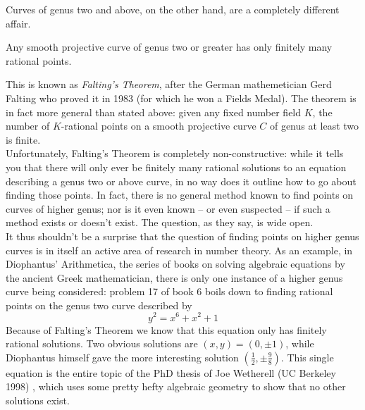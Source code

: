 \documentclass{book}
\begin{document}
Curves of genus two and above, on the other hand, are
a completely different affair.

\begin{theorem}
Any smooth projective curve of genus two or greater
has only finitely many rational points.
\end{theorem}

This is known as {\it Falting's Theorem}, after the
German mathemetician Gerd Falting who proved it in
1983 (for which he won a Fields Medal). The theorem
is in fact more general than stated above: given any
fixed number field $K$, the number of $K$-rational
points on a smooth projective curve $C$ of genus at
least two is finite. \\

Unfortunately, Falting's Theorem is completely non-constructive:
while it tells you that there will only ever be
finitely many rational solutions to an equation
describing a genus two or above curve, in no way does
it outline how to go about finding those points. In
fact, there is no general method known to find points
on curves of higher genus; nor is it even known -- or
even suspected -- if such a method exists or doesn't
exist. The question, as they say, is wide open. \\

It thus shouldn't be a surprise that the question of
finding points on higher genus curves is in itself an
active area of research in number theory. As an
example, in Diophantus' Arithmetica, the series of
books on solving algebraic equations by the ancient
Greek mathematician, there is only one instance of a
higher genus curve being considered: problem 17 of
book 6 boils down to finding rational points on the
genus two curve described by
\[ y^2 = x^6 + x^2 + 1 \]
Because of Falting's Theorem we know that this
equation only has finitely rational solutions. Two
obvious solutions are $(x,y) = (0,\pm 1)$, while
Diophantus himself gave the more interesting solution
$(\frac{1}{2},\pm \frac{9}{8})$. This single equation
is the entire topic of the PhD thesis of Joe
Wetherell (UC Berkeley 1998) \cite{wetherell1997bounding}, which uses some pretty
hefty algebraic geometry to show that no other
solutions exist. \\
\end{document}
